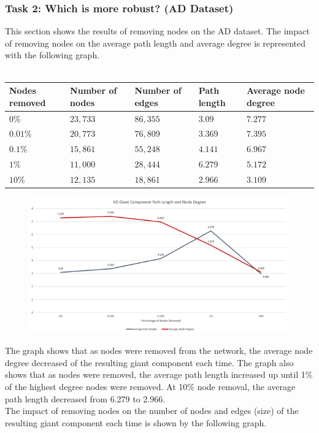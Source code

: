 \documentclass[conference]{IEEEtran}
\begin{document}
		\subsubsection{Task 2: Which is more robust? (AD Dataset)}
			{
				This section shows the results of removing nodes on the AD dataset. The impact of removing nodes on the average path length and average degree is represented with the following graph. \\ \\
				\begin{tabularx}{0.95\linewidth}{| X | X | X | X | X |}
					\hline
					\textbf{Nodes removed} & \textbf{Number of nodes} & \textbf{Number of edges} & \textbf{Path length} & \textbf{Average node degree} \\ \hline
					$0\%$ & $23,733$ & $86,355$ & $3.09$ & $7.277$ \\ \hline
					$0.01\%$ & $20,773$ & $76,809$ & $3.369$ & $7.395$ \\ \hline
					$0.1\%$ & $15,861$ & $55,248$ & $4.141$ & $6.967$ \\ \hline
					$1\%$ & $11,000$ & $28,444$ & $6.279$ & $5.172$ \\ \hline
					$10\%$ & $12,135$ & $18,861$ & $2.966$ & $3.109$ \\ \hline
				\end{tabularx}
			\par}
			\begin{figure}[htbp]
				\centerline{\includegraphics[width=\linewidth]{./images/robust_ad_path.png}}
				\label{robust_ad_path}
			\end{figure}
			{
				The graph shows that as nodes were removed from the network, the average node degree decreased of the resulting giant component each time. The graph also shows that as nodes were removed, the average path length increased up until 1\% of the highest degree nodes were removed. At 10\% node removal, the average path length decreased from 6.279 to 2.966. \\
				
				The impact of removing nodes on the number of nodes and edges (size) of the resulting giant component each time is shown by the following graph.
			\par}
\end{document}
